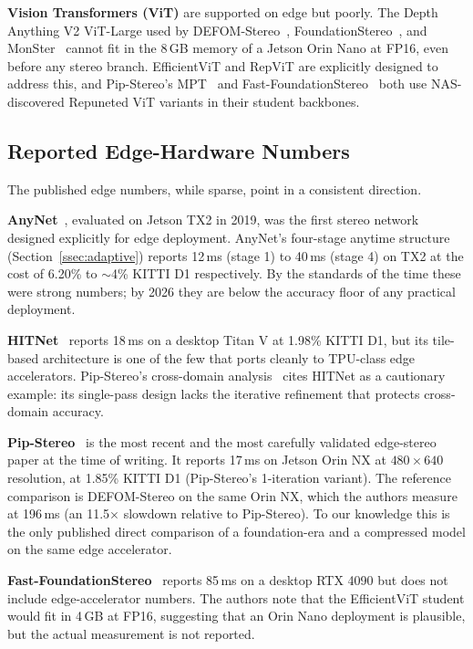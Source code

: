 \textbf{Vision Transformers (ViT)} are supported on edge but poorly. The Depth Anything V2 ViT-Large used by DEFOM-Stereo~\cite{jiang2025defom}, FoundationStereo~\cite{wen2025foundationstereo}, and MonSter~\cite{cheng2025monster} cannot fit in the 8\,GB memory of a Jetson Orin Nano at FP16, even before any stereo branch. EfficientViT and RepViT are explicitly designed to address this, and Pip-Stereo's MPT~\cite{zheng2026pipstereo} and Fast-FoundationStereo~\cite{wen2026fastfoundationstereo} both use NAS-discovered Repuneted ViT variants in their student backbones.

\subsection{Reported Edge-Hardware Numbers}

The published edge numbers, while sparse, point in a consistent direction.

\textbf{AnyNet}~\cite{wang2019anynet}, evaluated on Jetson TX2 in 2019, was the first stereo network designed explicitly for edge deployment. AnyNet's four-stage anytime structure (Section~\ref{ssec:adaptive}) reports 12\,ms (stage 1) to 40\,ms (stage 4) on TX2 at the cost of 6.20\% to $\sim$4\% KITTI D1 respectively. By the standards of the time these were strong numbers; by 2026 they are below the accuracy floor of any practical deployment.

\textbf{HITNet}~\cite{tankovich2021hitnet} reports 18\,ms on a desktop Titan V at 1.98\% KITTI D1, but its tile-based architecture is one of the few that ports cleanly to TPU-class edge accelerators. Pip-Stereo's cross-domain analysis~\cite{zheng2026pipstereo} cites HITNet as a cautionary example: its single-pass design lacks the iterative refinement that protects cross-domain accuracy.

\textbf{Pip-Stereo}~\cite{zheng2026pipstereo} is the most recent and the most carefully validated edge-stereo paper at the time of writing. It reports 17\,ms on Jetson Orin NX at $480 \times 640$ resolution, at 1.85\% KITTI D1 (Pip-Stereo's 1-iteration variant). The reference comparison is DEFOM-Stereo on the same Orin NX, which the authors measure at 196\,ms (an 11.5$\times$ slowdown relative to Pip-Stereo). To our knowledge this is the only published direct comparison of a foundation-era and a compressed model on the same edge accelerator.

\textbf{Fast-FoundationStereo}~\cite{wen2026fastfoundationstereo} reports 85\,ms on a desktop RTX 4090 but does not include edge-accelerator numbers. The authors note that the EfficientViT student would fit in 4\,GB at FP16, suggesting that an Orin Nano deployment is plausible, but the actual measurement is not reported.

